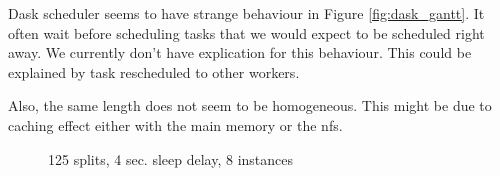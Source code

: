 \documentclass[11pt,a4paper]{article}
\begin{document}
Dask scheduler seems to have strange behaviour in Figure \ref{fig:dask_gantt}. It often wait before scheduling tasks that we would expect to be scheduled right away. We currently don't have explication for this behaviour. This could be explained by task rescheduled to other workers.

Also, the same length does not seem to be homogeneous. This might be due to caching effect either with the main memory or the nfs.

\begin{figure}[p]
    \centering
    
    \caption{125 splits, 4 sec. sleep delay, 8 instances}
    \label{fig:inc_gantt}
\end{figure}
\end{document}
